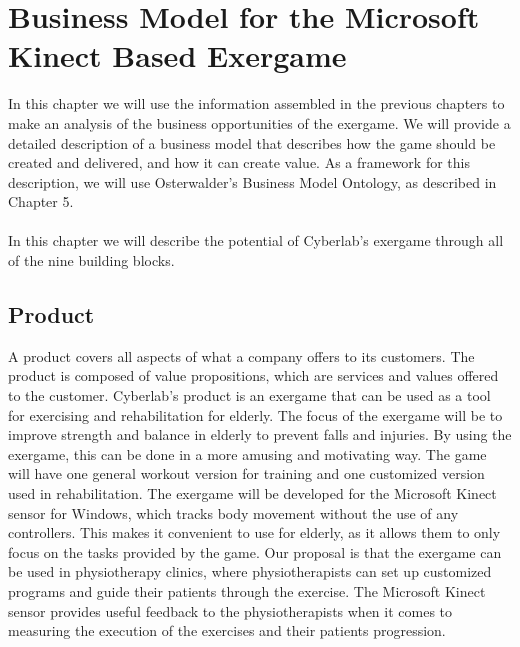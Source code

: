 \chapter{Business Model for the Microsoft Kinect Based Exergame}
In this chapter we will use the information assembled in the previous chapters to  make an analysis of the business opportunities of the exergame. We will provide a detailed description of a business model that describes how the game should be created and delivered, and how it can create value. As a framework for this description, we will use Osterwalder's Business Model Ontology, as described in Chapter 5. \\ \\ 
In this chapter we will describe the potential of Cyberlab's exergame through all of the nine building blocks.  

\section{Product}
A product covers all aspects of what a company offers to its customers. The product is composed of value propositions, which are services and values offered to the customer. Cyberlab’s product is an exergame that can be used as a tool for exercising and rehabilitation for elderly. The focus of the exergame will be to improve strength and balance in elderly to prevent falls and injuries. By using the exergame, this can be done in a more amusing and motivating way. The game will have one general workout version for training and one customized version used in rehabilitation. The exergame will be developed for the Microsoft Kinect sensor for Windows, which tracks body movement without the use of any controllers. This makes it convenient to use for elderly, as it allows them to only focus on the tasks provided by the game. Our proposal is that the exergame can be used in physiotherapy clinics, where physiotherapists can set up customized programs and guide their patients through the exercise. The Microsoft Kinect sensor provides useful feedback to the physiotherapists when it comes to measuring the execution of the exercises and their patients progression. 
